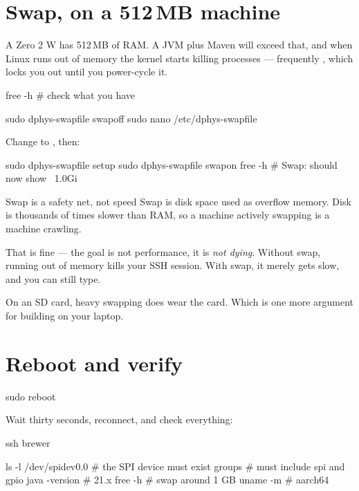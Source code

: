 \section{Swap, on a 512\,MB machine}

A Zero 2 W has 512\,MB of RAM. A JVM plus Maven will exceed that, and when Linux
runs out of memory the kernel starts killing processes --- frequently
, which locks you out until you power-cycle it.

\begin{shell}
free -h                    # check what you have

sudo dphys-swapfile swapoff
sudo nano /etc/dphys-swapfile
\end{shell}

Change  to , then:

\begin{shell}
sudo dphys-swapfile setup
sudo dphys-swapfile swapon
free -h                    # Swap: should now show ~1.0Gi
\end{shell}

\begin{concept}{Swap is a safety net, not speed}
Swap is disk space used as overflow memory. Disk is thousands of times slower
than RAM, so a machine actively swapping is a machine crawling.

That is fine --- the goal is not performance, it is \emph{not dying}. Without
swap, running out of memory kills your SSH session. With swap, it merely gets
slow, and you can still type.

On an SD card, heavy swapping does wear the card. Which is one more argument for
building on your laptop.
\end{concept}

\section{Reboot and verify}

\begin{shell}
sudo reboot
\end{shell}

Wait thirty seconds, reconnect, and check everything:

\begin{shell}
ssh brewer

ls -l /dev/spidev0.0        # the SPI device must exist
groups                      # must include spi and gpio
java -version               # 21.x
free -h                     # swap around 1 GB
uname -m                    # aarch64
\end{shell}

